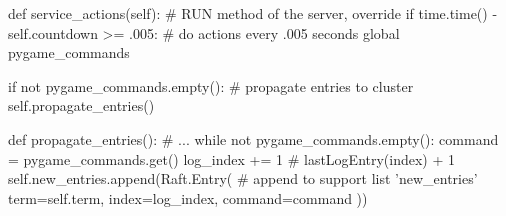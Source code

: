 \begin{python}[label={code:addCommands}, caption={Periodically checks whether there are new commands}]
def service_actions(self):                      # RUN method of the server, override
    if time.time() - self.countdown >= .005:    # do actions every .005 seconds
        global pygame_commands

        if not pygame_commands.empty():         # propagate entries to cluster
            self.propagate_entries()
\end{python}

\begin{python}[label={code:translateCommands}, caption={Translates commands into new entries}]
def propagate_entries():
# ...
    while not pygame_commands.empty():
        command = pygame_commands.get()
        log_index += 1                          # lastLogEntry(index) + 1
        self.new_entries.append(Raft.Entry(     # append to support list 'new_entries'
            term=self.term,
            index=log_index,
            command=command
        ))
\end{python}

